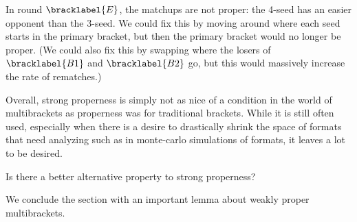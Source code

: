 {    In round $\bracklabel{E}$, the matchups are not proper: the 4-seed has an easier opponent than the 3-seed. We could fix this by moving around where each seed starts in the primary bracket, but then the primary bracket would no longer be proper. (We could also fix this by swapping where the losers of $\bracklabel{B1}$ and $\bracklabel{B2}$ go, but this would massively increase the rate of rematches.)

    Overall, strong properness is simply not as nice of a condition in the world of multibrackets as properness was for traditional brackets. While it is still often used, especially when there is a desire to drastically shrink the space of formats that need analyzing such as in monte-carlo simulations of formats, it leaves a lot to be desired.

    \begin{oq}{}{}
        Is there a better alternative property to strong properness?
    \end{oq}

    We conclude the section with an important lemma about weakly proper multibrackets.

}